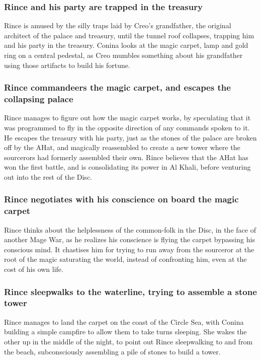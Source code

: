 \subsubsection{\Gls{Rince} and his party are trapped in the treasury}
\Gls{Rince} is amused by the silly traps laid by \Gls{Creo}'s grandfather, the original architect
of the palace and treasury, until the tunnel roof collapses, trapping him and his party in the
treasury. \Gls{Conina} looks at the magic carpet, lamp and gold ring on a central pedestal, as
\Gls{Creo} mumbles something about his grandfather using those artifacts to build his fortune.

\subsubsection{\Gls{Rince} commandeers the magic carpet, and escapes the collapsing palace}
\Gls{Rince} manages to figure out how the magic carpet works, by speculating that it was programmed
to fly in the opposite direction of any commands spoken to it. He escapes the treasury with his
party, just as the stones of the palace are broken off by the \Gls{AHat}, and magically reassembled
to create a new tower where the sourcerors had formerly assembled their own. \Gls{Rince} believes
that the \Gls{AHat} has won the first battle, and is consolidating its power in Al Khali, before
venturing out into the rest of the Disc.

\subsubsection{\Gls{Rince} negotiates with his conscience on board the magic carpet}
\Gls{Rince} thinks about the helplessness of the common-folk in the Disc, in the face of another
Mage War, as he realizes his conscience is flying the carpet bypassing his conscious mind. It
chastises him for trying to run away from the sourceror at the root of the magic saturating the
world, instead of confronting him, even at the cost of his own life.

\subsubsection{\Gls{Rince} sleepwalks to the waterline, trying to assemble a stone tower}
\Gls{Rince} manages to land the carpet on the coast of the Circle Sea, with \Gls{Conina} building a
simple campfire to allow them to take turns sleeping. She wakes the other up in the middle of the
night, to point out \Gls{Rince} sleepwalking to and from the beach, subconsciously assembling a pile
of stones to build a tower.

